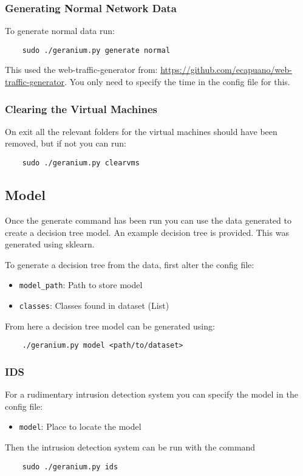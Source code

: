 \subsubsection{Generating Normal Network Data}

To generate normal data run:

\begin{verbatim}
    sudo ./geranium.py generate normal
\end{verbatim}
This used the web-traffic-generator from: \url{https://github.com/ecapuano/web-traffic-generator}. You only need to specify the time in the config file for this.
\subsubsection{Clearing the Virtual Machines}
On exit all the relevant folders for the virtual machines should have been removed, but if not you can run:

\begin{verbatim}
    sudo ./geranium.py clearvms
\end{verbatim}

\subsection{Model}

Once the generate command has been run you can use the data generated to create a decision tree model. An example decision tree is provided. This was generated using sklearn.

To generate a decision tree from the data, first alter the config file:
\begin{itemize}
    \item \texttt{model\_path}: Path to store model
    \item \texttt{classes}: Classes found in dataset (List)
\end{itemize}

From here a decision tree model can be generated using:

\begin{verbatim}
    ./geranium.py model <path/to/dataset>
\end{verbatim}

\subsubsection{IDS}

For a rudimentary intrusion detection system you can specify the model in the config file:
\begin{itemize}
    \item \texttt{model}: Place to locate the model
\end{itemize}
Then the intrusion detection system can be run with the command

\begin{verbatim}
    sudo ./geranium.py ids
\end{verbatim}
